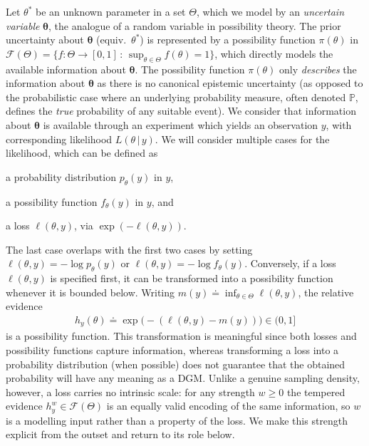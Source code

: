\documentclass[accepted]{uai2026} %
\def\given{\,|\,}
\theoremstyle{remark}
\begin{document}
Let $\theta^*$ be an unknown parameter in a set $\Theta$, which we model by an \emph{uncertain variable} $\bm{\theta}$, the analogue of a random variable in possibility theory. The prior uncertainty about $\bm{\theta}$ (equiv.\ $\theta^*$) is represented by a possibility function $\pi(\theta)$ in $\mathcal{F}(\Theta) = \{f:\Theta \to [0,1] \, : \, \sup_{\theta\in \Theta} f(\theta)=1 \}$, which directly models the available information about $\bm{\theta}$. The possibility function $\pi(\theta)$ only \emph{describes} the information about $\bm{\theta}$ as there is no canonical epistemic uncertainty (as opposed to the probabilistic case where an underlying probability measure, often denoted $\mathbb{P}$, defines the \emph{true} probability of any suitable event). We consider that information about $\bm{\theta}$ is available through an experiment which yields an observation $y$, with corresponding likelihood $L(\theta \given y)$. We will consider multiple cases for the likelihood, which can be defined as
\begin{enumerate*}[label=\roman*)]
    \item a probability distribution $p_{\theta}(y)$ in $y$,
    \item a possibility function $f_{\theta}(y)$ in $y$, and
    \item a loss $\ell(\theta, y)$, via $\exp(- \ell(\theta, y))$.
\end{enumerate*}
The last case overlaps with the first two cases by setting $\ell(\theta,y)=-\log p_{\theta}(y)$ or $\ell(\theta,y)=-\log f_{\theta}(y)$. Conversely, if a loss $\ell(\theta, y)$ is specified first, it can be transformed into a possibility function whenever it is bounded below. Writing $m(y)\doteq\inf_{\theta\in\Theta}\ell(\theta,y)$, the relative evidence
\begin{align}
    \label{eq:relative-evidence}
    h_y(\theta) \doteq \exp\big(-(\ell(\theta,y)-m(y))\big) \in (0,1]
\end{align}
is a possibility function. This transformation is meaningful since both losses and possibility functions capture information, whereas transforming a loss into a probability distribution (when possible) does not guarantee that the obtained probability will have any meaning as a DGM. Unlike a genuine sampling density, however, a loss carries no intrinsic scale: for any strength $w\ge 0$ the tempered evidence $h_y^{w}\in\mathcal F(\Theta)$ is an equally valid encoding of the same information, so $w$ is a modelling input rather than a property of the loss. We make this strength explicit from the outset and return to its role below.
\end{document}
